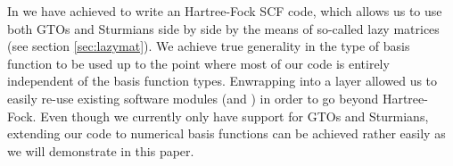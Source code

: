 In \molsturm we have achieved to write an Hartree-Fock SCF code,
which allows us to use both GTOs and Sturmians side by side by the means
of so-called lazy matrices (see section \ref{sec:lazymat}).
We achieve true generality in the type of basis function to be used
up to the point where most of our code is entirely
independent of the basis function types.
Enwrapping \molsturm into a \python layer allowed us to easily re-use existing
software modules (\adcman and \pyscf) in order to go beyond Hartree-Fock.
Even though we currently only have support for GTOs and Sturmians,
extending our code to numerical basis functions can be achieved rather easily
as we will demonstrate in this paper.




